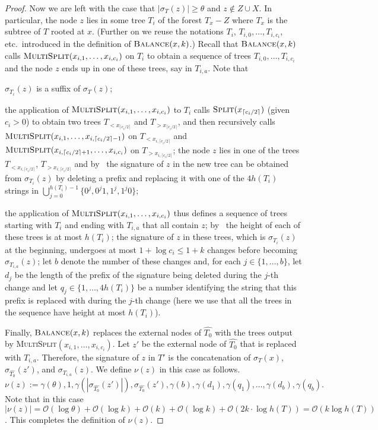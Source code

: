 \documentclass[kpfonts]{patmorin}
\newcommand{\Oh}{\mathcal{O}}
\let\leq\leqslant
\let\geq\geqslant
\begin{document}
\begin{proof}
  Now we are left with the case that $|\sigma_{T}(z)|\geq \theta$ and $z\not\in Z\cup X$. In particular, the node $z$ lies in some tree $T_i$ of the forest $T_x - Z$ where $T_x$ is the subtree of $T$ rooted at $x$.
  (Further on we reuse the notations $T_i$, $T_{i,0},\dots,T_{i,c_i}$, etc.\ introduced in the definition of $\textsc{Balance}(x,k)$.)
  Recall that $\textsc{Balance}(x,k)$ calls $\textsc{MultiSplit}(x_{i,1},\dots,x_{i,c_i})$ on $T_i$ to obtain a sequence of trees $T_{i,0},\dots,T_{i,c_i}$ and the node $z$ ends up in one of these trees, say in $T_{i,a}$.
  Note that
  \begin{compactenum}[(i)]
  \item $\sigma_{T_i}(z)$ is a suffix of $\sigma_{T}(z)$;
  \item the application of $\textsc{MultiSplit}(x_{i,1},\dots,x_{i,c_i})$ to $T_i$ calls $\textsc{Split}(x_{
  \lceil c_i/2\rceil})$ (given $c_i>0$) to obtain two trees $T_{<x_{\lceil c_i/2\rceil}}$ and $T_{>x_{\lceil c_i/2\rceil}}$, and then recursively calls $\textsc{MultiSplit}(x_{i,1},\dots,x_{i,\lceil c_i/2\rceil-1})$  on $T_{<x_{i,\lceil c_i/2\rceil}}$ and $\textsc{MultiSplit}(x_{i,\lceil c_i/2\rceil+1},\dots,x_{i,c_i})$  on $T_{>x_{i,\lceil c_i/2\rceil}}$;
  the node $z$ lies in one of the trees $T_{<x_{i,\lceil c_i/2\rceil}}$, $T_{>x_{i,\lceil c_i/2\rceil}}$ and by~ the signature of $z$ in the new tree can be obtained from $\sigma_{T_i}(z)$ by deleting a prefix and replacing it with one of the $4h(T_i)$ strings in $\bigcup_{j=0}^{h(T_i)-1}\{0^j,0^j1,1^j,1^j0\}$;
  \item the application of $\textsc{MultiSplit}(x_{i,1},\dots,x_{i,c_i})$ thus defines a sequence of trees starting with $T_i$ and ending with $T_{i,a}$ that all contain $z$;
  by~ the height of each of these trees is at most $h(T_i)$;
  the signature of $z$ in these trees, which is $\sigma_{T_i}(z)$ at the beginning, undergoes at most $1+\log c_i \leq 1+k$ changes
  before becoming $\sigma_{T_{i,a}}(z)$; let $b$ denote the number of these changes and, for each $j\in\{1,\dots,b\}$, let $d_j$ be the length of the prefix of the signature being deleted during the $j$-th change and let $q_j\in \{1, \dots, 4h(T_i)\}$ be a number identifying the string that this prefix is replaced with during the $j$-th change (here we use that all the trees in the sequence have height at most $h(T_i)$).
  \end{compactenum}

  Finally, $\textsc{Balance}(x,k)$ replaces the external nodes of $\hat{T_0}$ with the trees output by \textsc{MultiSplit}$(x_{i,1},\dots,x_{i,c_i})$.
  Let $z'$ be the external node of $\hat{T_0}$ that is replaced with $T_{i,a}$.
  Therefore, the signature of $z$ in $T'$ is the concatenation of $\sigma_{T}(x)$, $\sigma_{\hat{T_0}}(z')$, and $\sigma_{T_{i,a}}(z)$.
  We define $\nu(z)$ in this case as follows.
    \[
  \nu(z) := \gamma(\theta),1,\gamma(|\sigma_{\hat{T_0}}(z')|),\sigma_{\hat{T_0}}(z'),\gamma(b),
  \gamma(d_1),\gamma(q_1),\dots,\gamma(d_b),\gamma(q_b).
  \]
  Note that in this case $|\nu(z)|=\Oh(\log\theta) + \Oh(\log k) + \Oh(k) + \Oh(\log k) + \Oh(2k\cdot\log h(T))=\Oh(k\log h(T))$.
  This completes the definition of $\nu(z)$.


\end{proof}
\end{document}
